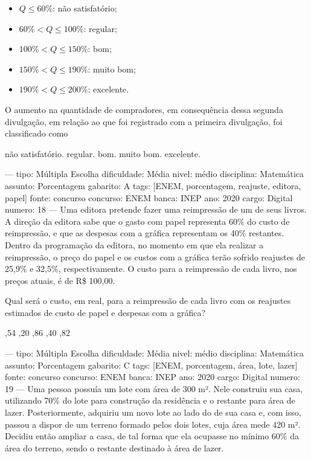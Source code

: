 \begin{itemize}
\item $Q \leq 60\%$: não satisfatório;
\item $60\% < Q \leq 100\%$: regular;
\item $100\% < Q \leq 150\%$: bom;
\item $150\% < Q \leq 190\%$: muito bom;
\item $190\% < Q \leq 200\%$: excelente.
\end{itemize}

O aumento na quantidade de compradores, em consequência dessa segunda divulgação, em relação ao que foi registrado com a primeira divulgação, foi classificado como
\begin{choices}
\choice não satisfatório.
\choice regular.
\CorrectChoice bom.
\choice muito bom.
\choice excelente.
\end{choices}

---
tipo: Múltipla Escolha
dificuldade: Média
nivel: médio
disciplina: Matemática
assunto: Porcentagem
gabarito: A
tags: [ENEM, porcentagem, reajuste, editora, papel]
fonte: concurso
concurso: ENEM
banca: INEP
ano: 2020
cargo: Digital
numero: 18
---
\question
Uma editora pretende fazer uma reimpressão de um de seus livros. A direção da editora sabe que o gasto com papel representa 60\% do custo de reimpressão, e que as despesas com a gráfica representam os 40\% restantes. Dentro da programação da editora, no momento em que ela realizar a reimpressão, o preço do papel e os custos com a gráfica terão sofrido reajustes de 25,9\% e 32,5\%, respectivamente. O custo para a reimpressão de cada livro, nos preços atuais, é de R\$ 100,00.

Qual será o custo, em real, para a reimpressão de cada livro com os reajustes estimados de custo de papel e despesas com a gráfica?
\begin{choices}
,54
,20
,86
,40
,82
\end{choices}

---
tipo: Múltipla Escolha
dificuldade: Média
nivel: médio
disciplina: Matemática
assunto: Porcentagem
gabarito: C
tags: [ENEM, porcentagem, área, lote, lazer]
fonte: concurso
concurso: ENEM
banca: INEP
ano: 2020
cargo: Digital
numero: 19
---
\question
Uma pessoa possuía um lote com área de 300 m². Nele construiu sua casa, utilizando 70\% do lote para construção da residência e o restante para área de lazer. Posteriormente, adquiriu um novo lote ao lado do de sua casa e, com isso, passou a dispor de um terreno formado pelos dois lotes, cuja área mede 420 m². Decidiu então ampliar a casa, de tal forma que ela ocupasse no mínimo 60\% da área do terreno, sendo o restante destinado à área de lazer.

